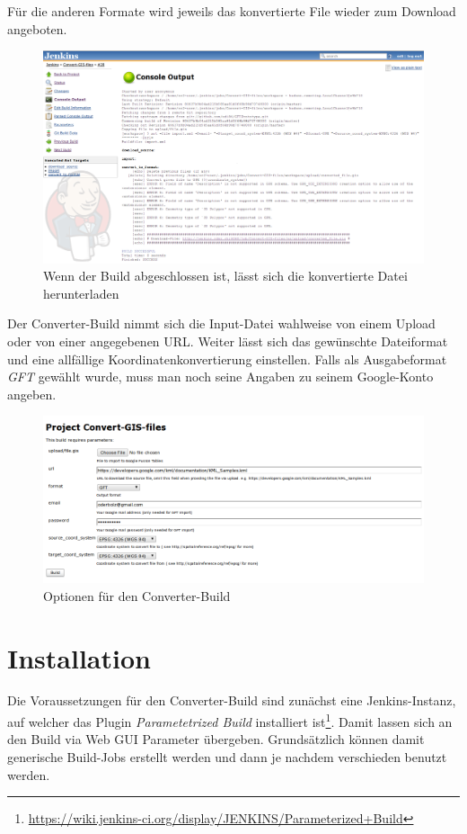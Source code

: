 Für die anderen Formate wird jeweils das konvertierte File wieder zum Download angeboten.

\begin{figure}[!ht]
	\centering
	\includegraphics[width=\textwidth]{images/converter-build/converter-build-done}
	\caption{Wenn der Build abgeschlossen ist, lässt sich die konvertierte Datei herunterladen}
	\label{converter-build-import}
\end{figure}

Der Converter-Build nimmt sich die Input-Datei wahlweise von einem Upload oder von einer angegebenen URL. Weiter lässt sich das gewünschte Dateiformat und eine allfällige Koordinatenkonvertierung einstellen. Falls als Ausgabeformat \emph{GFT} gewählt wurde, muss man noch seine Angaben zu seinem Google-Konto angeben.

\begin{figure}[!ht]
	\centering
	\includegraphics[width=\textwidth]{images/converter-build/converter-build-import}
	\caption{Optionen für den Converter-Build}
	\label{converter-build-import}
\end{figure}

\section{Installation}
Die Voraussetzungen für den Converter-Build sind zunächst eine Jenkins-Instanz, auf welcher das Plugin \emph{Parametetrized Build} installiert ist\footnote{\url{https://wiki.jenkins-ci.org/display/JENKINS/Parameterized+Build}}. Damit lassen sich an den Build via Web GUI Parameter übergeben. Grundsätzlich können damit generische Build-Jobs erstellt werden und dann je nachdem verschieden benutzt werden. 

